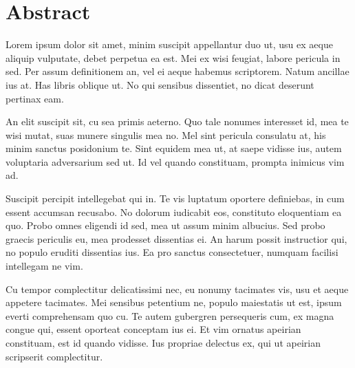 \chapter*{Abstract}
\justify

Lorem ipsum dolor sit amet, minim suscipit appellantur duo ut, usu ex aeque aliquip vulputate, debet perpetua ea est. Mei ex wisi feugiat, labore pericula in sed. Per assum definitionem an, vel ei aeque habemus scriptorem. Natum ancillae ius at. Has libris oblique ut. No qui sensibus dissentiet, no dicat deserunt pertinax eam.

An elit suscipit sit, cu sea primis aeterno. Quo tale nonumes interesset id, mea te wisi mutat, suas munere singulis mea no. Mel sint pericula consulatu at, his minim sanctus posidonium te. Sint equidem mea ut, at saepe vidisse ius, autem voluptaria adversarium sed ut. Id vel quando constituam, prompta inimicus vim ad.

Suscipit percipit intellegebat qui in. Te vis luptatum oportere definiebas, in cum essent accumsan recusabo. No dolorum iudicabit eos, constituto eloquentiam ea quo. Probo omnes eligendi id sed, mea ut assum minim albucius. Sed probo graecis periculis eu, mea prodesset dissentias ei. An harum possit instructior qui, no populo eruditi dissentias ius. Ea pro sanctus consectetuer, numquam facilisi intellegam ne vim.

Cu tempor complectitur delicatissimi nec, eu nonumy tacimates vis, usu et aeque appetere tacimates. Mei sensibus petentium ne, populo maiestatis ut est, ipsum everti comprehensam quo cu. Te autem gubergren persequeris cum, ex magna congue qui, essent oporteat conceptam ius ei. Et vim ornatus apeirian constituam, est id quando vidisse. Ius propriae delectus ex, qui ut apeirian scripserit complectitur.

